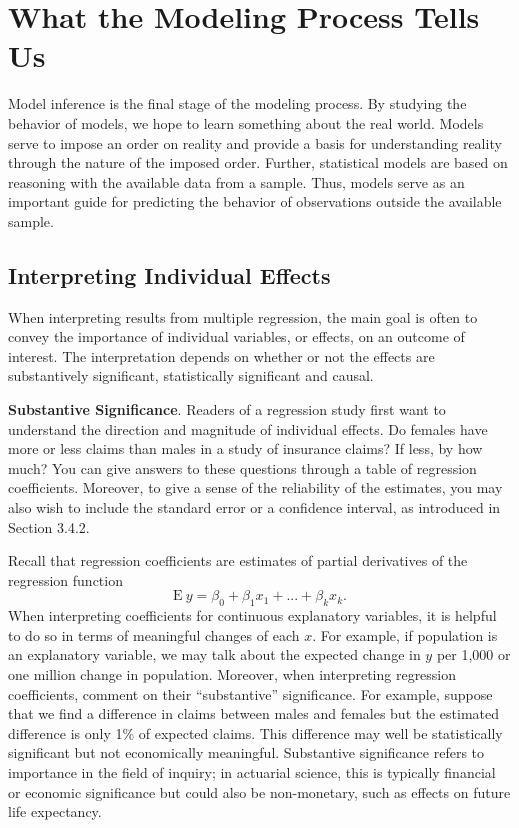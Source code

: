 \section{What the Modeling Process Tells Us}

Model inference is the final stage of the modeling process. By
studying the behavior of models, we hope to learn something about
the real world. Models serve to impose an order on reality and
provide a basis for understanding reality through the nature of the
imposed order. Further, statistical models are based on reasoning
with the available data from a sample. Thus, models serve as an
important guide for predicting the behavior of observations outside
the available sample.

\subsection{Interpreting Individual Effects}

When interpreting results from multiple regression, the main goal is
often to convey the importance of individual variables, or effects,
on an outcome of interest. The interpretation depends on whether or
not the effects are substantively significant, statistically
significant and causal.


\noindent \textbf{Substantive Significance}. Readers of a regression
study first want to understand the direction and magnitude of
individual effects. Do females have more or less claims than males
in a study of insurance claims? If less, by how much? You can give
answers to these questions through a table of regression
coefficients. Moreover, to give a sense of the reliability of the
estimates, you may also wish to include the standard error or a
confidence interval, as introduced in Section 3.4.2.

Recall that regression coefficients are estimates of partial
derivatives of the regression function
\begin{equation*}
\mathrm{E~}y = \beta_0 + \beta_1 x_1 +...+\beta _k x_k.
\end{equation*}
When interpreting coefficients for continuous explanatory variables,
it is helpful to do so in terms of meaningful changes of each $x$.
For example, if population is an explanatory variable, we may talk
about the expected change in $y$ per 1,000 or one million change in
population. Moreover, when interpreting regression coefficients,
comment on their ``substantive'' significance. For example, suppose
that we find a difference in claims between males and females but
the estimated difference is only 1\% of expected claims. This
difference may well be statistically significant but not
economically meaningful. Substantive significance refers to
importance in the field of inquiry; in actuarial science, this is
typically financial or economic significance but could also be
non-monetary, such as effects on future life expectancy.

